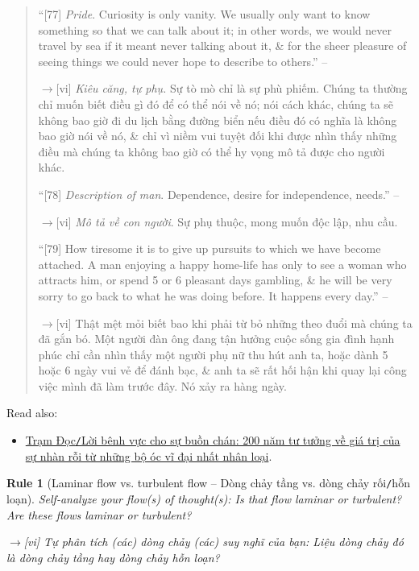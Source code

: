 \documentclass[12pt,oneside]{book}
\newtheorem{Rule}{Rule}
\begin{document}
\begin{quote}
	``[77] {\it Pride}. Curiosity is only vanity. We usually only want to know something so that we can talk about it; in other words, we would never travel by sea if it meant never talking about it, \& for the sheer pleasure of seeing things we could never hope to describe to others.'' -- \cite[IV. Boredom]{Pascal_pensees}
	
	{\sf[en]$\to$[vi]} {\it Kiêu căng, tự phụ.} Sự tò mò chỉ là sự phù phiếm. Chúng ta thường chỉ muốn biết điều gì đó để có thể nói về nó; nói cách khác, chúng ta sẽ không bao giờ đi du lịch bằng đường biển nếu điều đó có nghĩa là không bao giờ nói về nó, \& chỉ vì niềm vui tuyệt đối khi được nhìn thấy những điều mà chúng ta không bao giờ có thể hy vọng mô tả được cho người khác.
	
	``[78] {\it Description of man}. Dependence, desire for independence, needs.'' -- \cite[IV. Boredom]{Pascal_pensees}
	
	{\sf[en]$\to$[vi]} {\it Mô tả về con người}. Sự phụ thuộc, mong muốn độc lập, nhu cầu.
		
	``[79] How tiresome it is to give up pursuits to which we have become attached. A man enjoying a happy home-life has only to see a woman who attracts him, or spend 5 or 6 pleasant days gambling, \& he will be very sorry to go back to what he was doing before. It happens every day.'' -- \cite[IV. Boredom]{Pascal_pensees}
	
	{\sf[en]$\to$[vi]} Thật mệt mỏi biết bao khi phải từ bỏ những theo đuổi mà chúng ta đã gắn bó. Một người đàn ông đang tận hưởng cuộc sống gia đình hạnh phúc chỉ cần nhìn thấy một người phụ nữ thu hút anh ta, hoặc dành 5 hoặc 6 ngày vui vẻ để đánh bạc, \& anh ta sẽ rất hối hận khi quay lại công việc mình đã làm trước đây. Nó xảy ra hàng ngày.
\end{quote}
Read also:
\begin{itemize}
	\item \href{https://tramdoc.vn/tin-tuc/loi-benh-vuc-cho-su-buon-chan-200-nam-tu-tuong-ve-gia-tri-cua-su-nhan-roi-tu-nhung-bo-oc-vi-dai-nhat-nhan-loai-nnlAW.html}{Trạm Đọc{\tt/}Lời bênh vực cho sự buồn chán: 200 năm tư tưởng về giá trị của sự nhàn rỗi từ những bộ óc vĩ đại nhất nhân loại}.
\end{itemize}

\begin{Rule}[Laminar flow vs. turbulent flow -- Dòng chảy tầng vs. dòng chảy rối{\tt/}hỗn loạn]
	Self-analyze your flow(s) of thought(s): Is that flow laminar or turbulent? Are these flows laminar or turbulent?
	
	{\sf[en]$\to$[vi]} Tự phân tích (các) dòng chảy (các) suy nghĩ của bạn: Liệu dòng chảy đó là dòng chảy tầng hay dòng chảy hỗn loạn?
\end{Rule}
\end{document}
